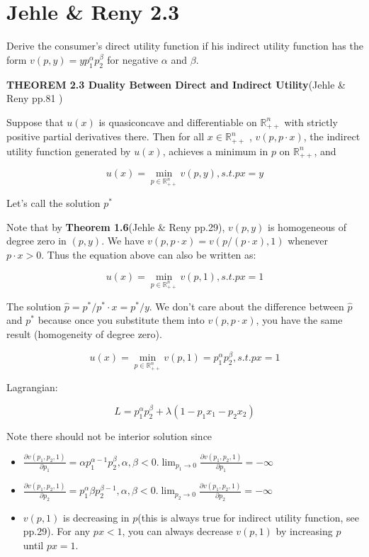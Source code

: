 \documentclass{article}
\newcommand{\R}{\mathbb{R}}
\begin{document}
\section{Jehle \& Reny 2.3}
Derive the consumer’s direct utility function if his indirect utility function has the form $v(p, y) =
yp_1^\alpha p_2^\beta$ for negative $\alpha$ and $\beta$.

\begin{mdframed}[backgroundcolor=blue!20,linecolor=white]
\textbf{THEOREM 2.3 Duality Between Direct and Indirect Utility}(Jehle \& Reny pp.81 )


Suppose that $u(x)$ is quasiconcave and differentiable on $\R^n_{++}$ with strictly positive partial derivatives there. Then for all $x \in \R^n_{++}$ , $v(p, p \cdot x)$, the indirect utility function generated
by $u(x)$, achieves a minimum in $p$ on $\R^n_{++}$, and

$$u(x) = \min_{p \in \R^n_{++}}  v(p,y), s.t. px=y$$

Let's call the solution $p^*$

Note that by \textbf{Theorem 1.6}(Jehle \& Reny pp.29), $v(p, y)$ is homogeneous of degree zero in $(p, y)$. We have $v(p, p \cdot x) = v(p/(p \cdot x), 1)$ whenever $p \cdot x > 0$. Thus the equation above can also be written as:

$$u(x) = \min_{p \in \R^n_{++}}  v(p,1), s.t. px=1$$

The solution $\hat{p} = p^* / p^* \cdot x = p^* / y$. We don't care about the difference between $\hat{p}$ and $p^*$ because once you substitute them into $v(p,p\cdot x)$, you have the same result (homogeneity of degree zero).
\end{mdframed}

$$u(x) = \min_{p \in \R^n_{++}}  v(p, 1) =
p_1^\alpha p_2^\beta, s.t. px=1$$

Lagrangian:

$$L = p_1^\alpha p_2^\beta + \lambda (1- p_1x_1 - p_2x_2)$$

Note there should not be interior solution since

\begin{itemize}
\item $\frac{\partial v(p_1,p_2,1)}{\partial p_1} = \alpha p_1^{\alpha -1}p_2^\beta, \alpha, \beta < 0. \lim_{p_1 \to 0} \frac{\partial v(p_1,p_2,1)}{\partial p_1} = - \infty$

\item $\frac{\partial v(p_1,p_2,1)}{\partial p_2} = p_1^{\alpha} \beta p_2^{\beta - 1}, \alpha, \beta < 0. \lim_{p_2 \to 0} \frac{\partial v(p_1,p_2,1)}{\partial p_2} = - \infty$

\item $v(p,1)$ is decreasing in $p$(this is always true for indirect utility function, see pp.29). For any $px<1$, you can always decrease $v(p, 1)$ by increasing $p$ until $px = 1$.
\end{itemize}
\end{document}
